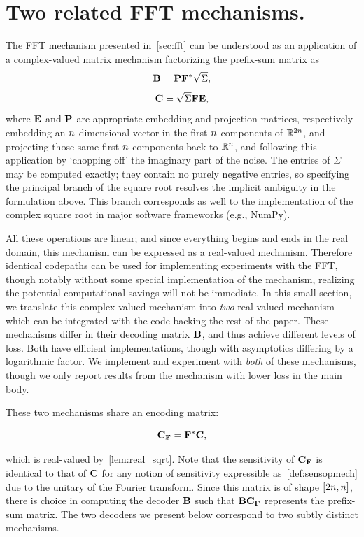 \section{Two related FFT mechanisms.}\label{app:two_dft_mechanisms}

The FFT mechanism presented in~\cref{sec:fft} can be understood as an application of a complex-valued matrix mechanism factorizing the prefix-sum matrix as
\[
\mathbf{B} = \mathbf{P} \mathbf{F}^* \sqrt{\Sigma},
\]
\[
\mathbf{C} = \sqrt{\Sigma} \mathbf{F} \mathbf{E},
\]
where $\mathbf{E}$ and $\mathbf{P}$ are appropriate embedding and projection matrices, respectively embedding an $n$-dimensional vector in the first $n$ components of $\mathbb{R}^{2n}$, and projecting those same first $n$ components back to $\mathbb{R}^n$, and following this application by `chopping off' the imaginary part of the noise. The entries of $\Sigma$ may be computed exactly; they contain no purely negative entries, so specifying the principal branch of the square root resolves the implicit ambiguity in the formulation above. This branch corresponds as well to the implementation of the complex square root in major software frameworks (e.g., NumPy).

All these operations are linear; and since everything begins and ends in the real domain, this mechanism can be expressed as a real-valued mechanism. Therefore identical codepaths can be used for implementing experiments with the FFT, though notably without some special implementation of the mechanism, realizing the potential computational savings will not be immediate. In this small section, we translate this complex-valued mechanism into \emph{two} real-valued mechanism which can be integrated with the code backing the rest of the paper. These mechanisms differ in their decoding matrix $\mathbf{B}$, and thus achieve different levels of loss. Both have efficient implementations, though with asymptotics differing by a logarithmic factor. We implement and experiment with \emph{both} of these mechanisms, though we only report results from the mechanism with lower loss in the main body.

These two mechanisms share an encoding matrix:

\newcommand{\fftencoder}{\ensuremath{\bfC_\bfF}}
\newcommand{\fftdecoder}{\ensuremath{\bfB_\bfF}}

\[
 \fftencoder= \fft\herm\bfC,
\]

which is real-valued by~\cref{lem:real_sqrt}. 
Note that the sensitivity of $\fftencoder$ is identical to that of $\mathbf{C}$ for any notion of sensitivity expressible as~\cref{def:sensopmech} due to the unitary of the Fourier transform. Since this matrix is of shape $[2n, n]$, there is choice in computing the decoder $\mathbf{B}$ such that $\bfB\fftencoder$ represents the prefix-sum matrix. The two decoders we present below correspond to two subtly distinct mechanisms.

